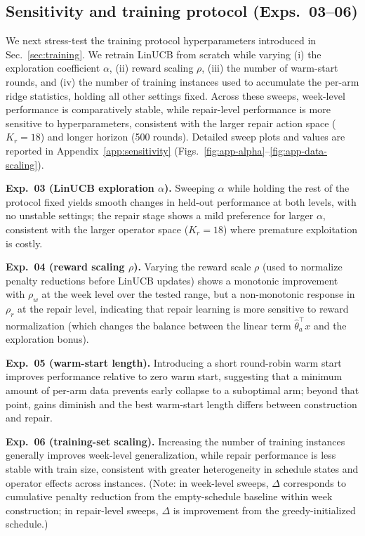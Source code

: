 \documentclass{article}
\begin{document}
\subsection{Sensitivity and training protocol (Exps.~03--06)}
\label{sec:sensitivity}

We next stress-test the training protocol hyperparameters introduced in
Sec.~\ref{sec:training}. We retrain LinUCB from scratch while varying (i) the
exploration coefficient $\alpha$, (ii) reward scaling $\rho$, (iii) the number
of warm-start rounds, and (iv) the number of training instances used to
accumulate the per-arm ridge statistics, holding all other settings fixed.
Across these sweeps, week-level performance is comparatively stable, while
repair-level performance is more sensitive to hyperparameters, consistent with
the larger repair action space ($K_r=18$) and longer horizon (500 rounds).
Detailed sweep plots and values are reported in Appendix~\ref{app:sensitivity}
(Figs.~\ref{fig:app-alpha}--\ref{fig:app-data-scaling}).

\textbf{Exp.~03 (LinUCB exploration $\alpha$).} Sweeping $\alpha$ while holding the
rest of the protocol fixed yields smooth changes in held-out performance at both
levels, with no unstable settings; the repair stage shows a mild preference for
larger $\alpha$, consistent with the larger operator space ($K_r{=}18$) where
premature exploitation is costly.
\par\noindent\textbf{Exp.~04 (reward scaling $\rho$).} Varying the reward scale
$\rho$ (used to normalize penalty reductions before LinUCB updates) shows a
monotonic improvement with $\rho_w$ at the week level over the tested range, but
a non-monotonic response in $\rho_r$ at the repair level, indicating that repair
learning is more sensitive to reward normalization (which changes the balance
between the linear term $\hat{\theta}_a^\top x$ and the exploration bonus).
\par\noindent\textbf{Exp.~05 (warm-start length).} Introducing a short round-robin
warm start improves performance relative to zero warm start, suggesting that a
minimum amount of per-arm data prevents early collapse to a suboptimal arm;
beyond that point, gains diminish and the best warm-start length differs between
construction and repair.
\par\noindent\textbf{Exp.~06 (training-set scaling).} Increasing the number of
training instances generally improves week-level generalization, while repair
performance is less stable with train size, consistent with greater heterogeneity
in schedule states and operator effects across instances. (Note: in week-level
sweeps, $\Delta$ corresponds to cumulative penalty reduction from the empty-schedule
baseline within week construction; in repair-level sweeps, $\Delta$ is improvement
from the greedy-initialized schedule.)
\end{document}
